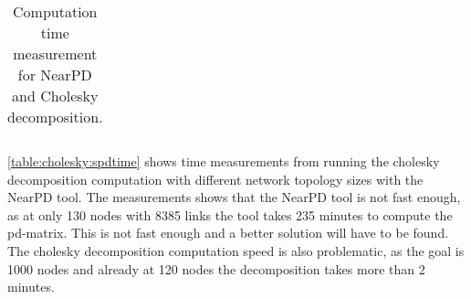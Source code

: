 \begin{table}[H]
\begin{tabular}{|c|c|c|c|}
    \end{tabular}
    \caption{Computation time measurement for NearPD and Cholesky decomposition.}
    \label{table:cholesky:spdtime}
\end{table}

\autoref{table:cholesky:spdtime} shows time measurements from running the cholesky decomposition computation with different network topology sizes with the NearPD tool. The measurements shows that the NearPD tool is not fast enough, as at only 130 nodes with 8385 links the tool takes 235 minutes to compute the \gls{pd-matrix}. This is not fast enough and a better solution will have to be found. The cholesky decomposition computation speed is also problematic, as the goal is 1000 nodes and already at 120 nodes the decomposition takes more than 2 minutes.

